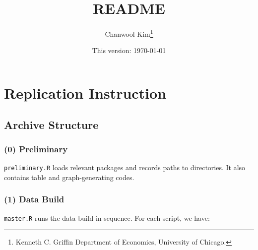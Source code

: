 \documentclass[11pt]{article}
\begin{document}
\title{README}
\author{Chanwool Kim\thanks{Kenneth C. Griffin Department of Economics, University of Chicago.}}
\date{This version: \today}
\maketitle

\section*{Replication Instruction}

\subsection*{Archive Structure}

\subsubsection*{(0) Preliminary}

\texttt{preliminary.R} loads relevant packages and records paths to directories. It also contains table and graph-generating codes.

\subsubsection*{(1) Data Build}

\texttt{master.R} runs the data build in sequence. For each script, we have:
\end{document}
